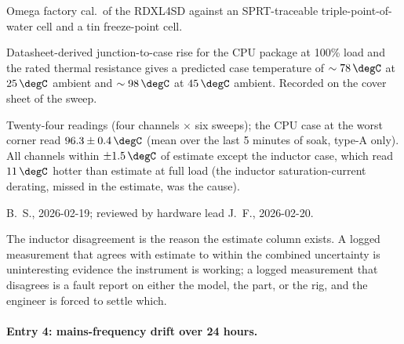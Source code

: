 \begin{description}[leftmargin=2em, itemsep=2pt]
    Omega factory cal.\ of the RDXL4SD against an SPRT-traceable
    triple-point-of-water cell and a tin freeze-point cell.
  \item[Estimate before reading.] Datasheet-derived junction-to-case
    rise for the CPU package at 100\% load and the rated thermal
    resistance gives a predicted case temperature of $\sim 78
    \,\degC$ at $25 \,\degC$ ambient and $\sim 98 \,\degC$ at
    $45 \,\degC$ ambient. Recorded on the cover sheet of the sweep.
  \item[Reading.] Twenty-four readings (four channels $\times$ six
    sweeps); the CPU case at the worst corner read
    $96.3 \pm 0.4 \,\degC$ (mean over the last 5 minutes of soak,
    type-A only). All channels within $\pm 1.5 \,\degC$ of estimate
    except the inductor case, which read $11 \,\degC$ hotter than
    estimate at full load (the inductor saturation-current
    derating, missed in the estimate, was the cause).
  \item[Signature.] B.~S., 2026-02-19; reviewed by hardware lead
    J.~F., 2026-02-20.
\end{description}

The inductor disagreement is the reason the estimate column exists.
A logged measurement that agrees with estimate to within the
combined uncertainty is uninteresting evidence the instrument is
working; a logged measurement that disagrees is a fault report on
either the model, the part, or the rig, and the engineer is forced
to settle which.

\paragraph{Entry 4: mains-frequency drift over 24 hours.}

